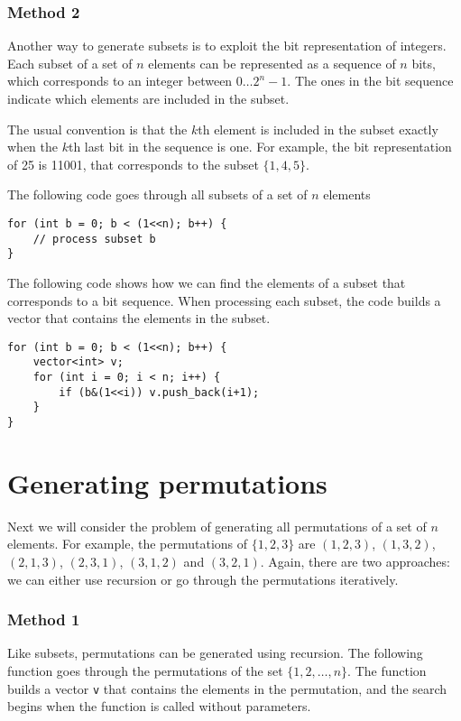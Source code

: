 \subsubsection{Method 2}

Another way to generate subsets is to exploit
the bit representation of integers.
Each subset of a set of $n$ elements
can be represented as a sequence of $n$ bits,
which corresponds to an integer between $0 \ldots 2^n-1$.
The ones in the bit sequence indicate
which elements are included in the subset.

The usual convention is that the $k$th element
is included in the subset exactly when the $k$th last bit
in the sequence is one.
For example, the bit representation of 25
is 11001, that corresponds to the subset $\{1,4,5\}$.

The following code goes through all subsets
of a set of $n$ elements

\begin{lstlisting}
for (int b = 0; b < (1<<n); b++) {
    // process subset b
}
\end{lstlisting}

The following code shows how we can find
the elements of a subset that corresponds to a bit sequence.
When processing each subset,
the code builds a vector that contains the
elements in the subset.

\begin{lstlisting}
for (int b = 0; b < (1<<n); b++) {
    vector<int> v;
    for (int i = 0; i < n; i++) {
        if (b&(1<<i)) v.push_back(i+1);
    }
}
\end{lstlisting}

\section{Generating permutations}


Next we will consider the problem of generating
all permutations of a set of $n$ elements.
For example, the permutations of $\{1,2,3\}$ are
$(1,2,3)$, $(1,3,2)$, $(2,1,3)$, $(2,3,1)$,
$(3,1,2)$ and $(3,2,1)$.
Again, there are two approaches:
we can either use recursion or go through the
permutations iteratively.

\subsubsection{Method 1}

Like subsets, permutations can be generated
using recursion.
The following function goes
through the permutations of the set $\{1,2,\ldots,n\}$.
The function builds a vector \texttt{v} that contains
the elements in the permutation,
and the search begins when the function is
called without parameters.

